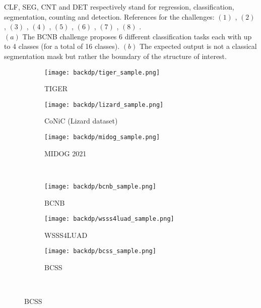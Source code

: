 \begin{table}
{  CLF, SEG, CNT and DET respectively stand for regression, classification, segmentation, counting and detection. References for the 
  challenges: $(1)$ \cite{vanrijthoven2021tiger}, $(2)$ \cite{graham2021conic}, $(3)$ \cite{aubreville2021mitosis}, $(4)$ \cite{xu2021predicting}, 
  $(5)$ \cite{han2021multilayer}, $(6)$ \cite{amgad2019structured}, $(7)$ \cite{amgad2021nucls}, $(8)$ \cite{kang2021paip}. \\
  $(a)$ The BCNB challenge proposes 6 different classification tasks each with up to 4 classes (for a total of 16 classes). $(b)$ The expected output is not a 
  classical segmentation mask but rather the boundary of the structure of interest.}
  \label{tab:backdp:datascarcity-grandchallenge}
\end{table}

\begin{figure}
  \centering
  \begin{subfigure}{0.30\textwidth}
    \centering
    \texttt{[image: backdp/tiger\_sample.png]}
    \caption{TIGER}
    \label{sfig:backdp:challenge_sample:tiger}
  \end{subfigure}
  \begin{subfigure}{0.30\textwidth}
    \centering
    \texttt{[image: backdp/lizard\_sample.png]}
    \caption{CoNiC (Lizard dataset)}
    \label{sfig:backdp:challenge_sample:conic}
  \end{subfigure} 
  \begin{subfigure}{0.30\textwidth}
    \centering
    \texttt{[image: backdp/midog\_sample.png]}
    \caption{MIDOG 2021}
    \label{sfig:backdp:challenge_sample:midog}
  \end{subfigure}\\

  \begin{subfigure}{0.30\textwidth}
    \centering
    \texttt{[image: backdp/bcnb\_sample.png]}
    \caption{BCNB}
    \label{sfig:backdp:challenge_sample:bcnb}
  \end{subfigure}
  \begin{subfigure}{0.30\textwidth}
    \centering
    \texttt{[image: backdp/wsss4luad\_sample.png]}
    \caption{WSSS4LUAD}
    \label{sfig:backdp:challenge_sample:wsss4luad}
  \end{subfigure}
  \begin{subfigure}{0.30\textwidth}
    \centering
    \texttt{[image: backdp/bcss\_sample.png]}
    \caption{BCSS}
    \label{sfig:backdp:challenge_sample:bcss}
  \end{subfigure} \\


\end{figure}

